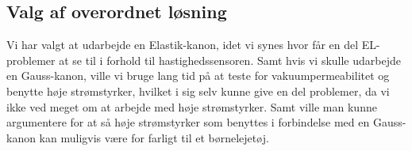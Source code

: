 \subsection{Valg af overordnet løsning}
Vi har valgt at udarbejde en Elastik-kanon, idet vi synes hvor får en del EL-problemer at se til i forhold til hastighedssensoren. Samt hvis vi skulle udarbejde en Gauss-kanon, ville vi bruge lang tid på at teste for vakuumpermeabilitet og benytte høje strømstyrker, hvilket i sig selv kunne give en del problemer, da vi ikke ved meget om at arbejde med høje strømstyrker. Samt ville man kunne argumentere for at så høje strømstyrker som benyttes i forbindelse med en Gauss-kanon kan muligvis være for farligt til et børnelejetøj.

